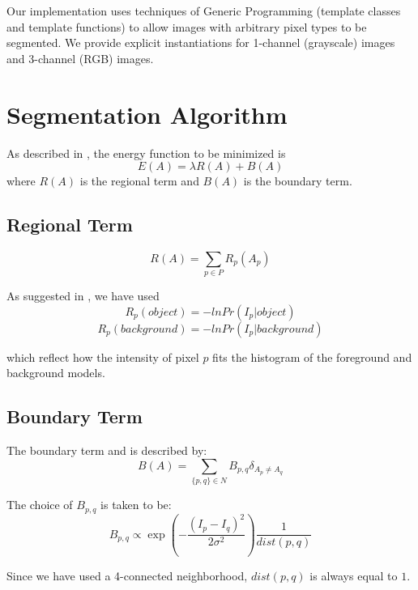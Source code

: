 \documentclass{InsightArticle}
\begin{document}
Our implementation uses techniques of Generic Programming (template classes and template functions) to allow images with arbitrary pixel types to be segmented. We provide explicit instantiations for 1-channel (grayscale) images and 3-channel (RGB) images.

\section{Segmentation Algorithm}
\label{sec:Algorithm}
As described in \cite{boykov2006}, the energy function to be minimized is
\begin{equation}
 E(A) = \lambda R(A) + B(A)
\end{equation}
where $R(A)$ is the regional term and $B(A)$ is the boundary term.

\subsection{Regional Term}
\label{subsec:RegionalTerm}
\begin{equation}
 R(A) = \sum_{p \in P} R_p(A_p)
\end{equation}

As suggested in \cite{boykov2006}, we have used
\begin{equation}
 R_p(object) = -ln Pr(I_p|object)
\end{equation}
\begin{equation}
 R_p(background) = -ln Pr(I_p|background)
\end{equation}

which reflect how the intensity of pixel $p$ fits the histogram of the foreground and background models.

\subsection{Boundary Term}
\label{subsec:BoundaryTerm}
The boundary term and is described by:
\begin{equation}
 B(A) = \sum_{ \{p,q\} \in N} B_{p,q} \delta_{A_p\neq A_q}
\end{equation}

The choice of $B_{p,q}$ is taken to be:
\begin{equation}
 B_{p,q} \propto \exp\left(-\frac{(I_p - I_q)^2}{2\sigma^2}\right) \frac{1}{dist(p,q)}
\end{equation}

Since we have used a 4-connected neighborhood, $dist(p,q)$ is always equal to $1$.
\end{document}

